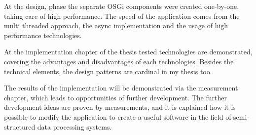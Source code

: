 At the design, phase the separate OSGi components were created one-by-one, taking care of high performance. The speed of the application comes from the multi threaded approach, the async implementation and the usage of high performance technologies.

At the implementation chapter of the thesis tested technologies are demonstrated, covering the advantages and disadvantages of each technologies. Besides the technical elements, the design patterns are cardinal in my thesis too.

The results of the implementation will be demonstrated via the measurement chapter, which leads to opportunities of further development. The further development ideas are proven by measurements, and it is explained how it is possible to modify the application to create a useful software in the field of semi-structured data processing systems.

\vfill